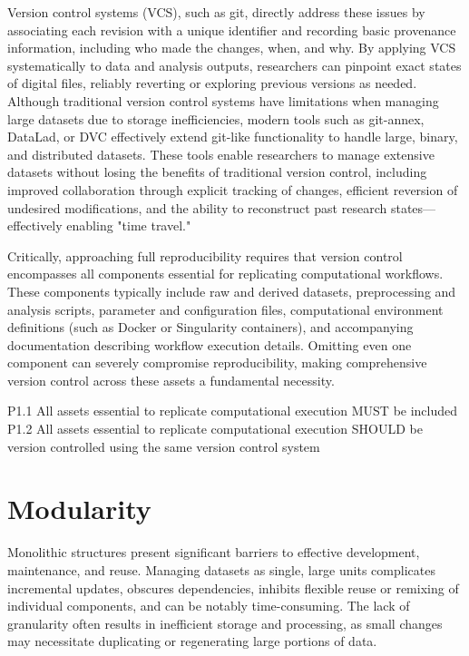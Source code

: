 \documentclass{article}
\begin{document}
Version control systems (VCS), such as git, directly address these issues by associating each revision with a unique identifier and recording basic provenance information, including who made the changes, when, and why.
By applying VCS systematically to data and analysis outputs, researchers can pinpoint exact states of digital files, reliably reverting or exploring previous versions as needed.
Although traditional version control systems have limitations when managing large datasets due to storage inefficiencies, modern tools such as git-annex, DataLad, or DVC effectively extend git-like functionality to handle large, binary, and distributed datasets.
These tools enable researchers to manage extensive datasets without losing the benefits of traditional version control, including improved collaboration through explicit tracking of changes, efficient reversion of undesired modifications, and the ability to reconstruct past research states—effectively enabling "time travel."

Critically, approaching full reproducibility requires that version control encompasses all components essential for replicating computational workflows.
These components typically include raw and derived datasets, preprocessing and analysis scripts, parameter and configuration files, computational environment definitions (such as Docker or Singularity containers), and accompanying documentation describing workflow execution details.
Omitting even one component can severely compromise reproducibility, making comprehensive version control across these assets a fundamental necessity.

P1.1 All assets essential to replicate computational execution MUST be included
P1.2 All assets essential to replicate computational execution SHOULD be version controlled using the same version control system

\section{Modularity}

Monolithic structures present significant barriers to effective development, maintenance, and reuse.
Managing datasets as single, large units complicates incremental updates, obscures dependencies, inhibits flexible reuse or remixing of individual components, and can be notably time-consuming.
The lack of granularity often results in inefficient storage and processing, as small changes may necessitate duplicating or regenerating large portions of data.
\end{document}
